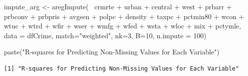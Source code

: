 \documentclass[]{article}
\newenvironment{Shaded}{}{}
\newcommand{\DataTypeTok}[1]{#1}
\newcommand{\DecValTok}[1]{#1}
\newcommand{\KeywordTok}[1]{\textcolor[rgb]{0.00,0.00,1.00}{#1}}
\newcommand{\NormalTok}[1]{#1}
\newcommand{\OperatorTok}[1]{#1}
\newcommand{\StringTok}[1]{\textcolor[rgb]{0.00,0.50,0.50}{#1}}
\begin{document}
\begin{Shaded}
\begin{Highlighting}[]
\NormalTok{impute_arg <-}\StringTok{ }\KeywordTok{aregImpute}\NormalTok{(}\OperatorTok{~}\StringTok{ }\NormalTok{crmrte }\OperatorTok{+}\StringTok{  }\NormalTok{urban }\OperatorTok{+}\StringTok{ }\NormalTok{central }\OperatorTok{+}\StringTok{ }\NormalTok{west }\OperatorTok{+}
\StringTok{                         }\NormalTok{prbarr }\OperatorTok{+}\StringTok{ }\NormalTok{prbconv }\OperatorTok{+}\StringTok{ }\NormalTok{prbpris }\OperatorTok{+}\StringTok{ }\NormalTok{avgsen }\OperatorTok{+}\StringTok{ }\NormalTok{polpc }\OperatorTok{+}\StringTok{ }
\StringTok{                         }\NormalTok{density }\OperatorTok{+}\StringTok{ }\NormalTok{taxpc }\OperatorTok{+}\StringTok{ }\NormalTok{pctmin80 }\OperatorTok{+}\StringTok{ }\NormalTok{wcon }\OperatorTok{+}\StringTok{ }\NormalTok{wtuc }\OperatorTok{+}
\StringTok{                         }\NormalTok{wtrd }\OperatorTok{+}\StringTok{ }\NormalTok{wfir }\OperatorTok{+}\StringTok{ }\NormalTok{wser }\OperatorTok{+}\StringTok{ }\NormalTok{wmfg }\OperatorTok{+}\StringTok{ }\NormalTok{wfed }\OperatorTok{+}\StringTok{ }\NormalTok{wsta }\OperatorTok{+}\StringTok{ }\NormalTok{wloc }\OperatorTok{+}
\StringTok{                         }\NormalTok{mix }\OperatorTok{+}\StringTok{ }\NormalTok{pctymle, }\DataTypeTok{data =}\NormalTok{ dfCrime, }\DataTypeTok{match=}\StringTok{"weighted"}\NormalTok{,}
                         \DataTypeTok{nk=}\DecValTok{3}\NormalTok{, }\DataTypeTok{B=}\DecValTok{10}\NormalTok{, }\DataTypeTok{n.impute =} \DecValTok{100}\NormalTok{)}
\end{Highlighting}
\end{Shaded}

\begin{Shaded}
\begin{Highlighting}[]
\KeywordTok{paste}\NormalTok{(}\StringTok{"R-squares for Predicting Non-Missing Values for Each Variable"}\NormalTok{)}
\end{Highlighting}
\end{Shaded}

\begin{verbatim}
[1] "R-squares for Predicting Non-Missing Values for Each Variable"
\end{verbatim}

\begin{Shaded}
\end{Shaded}
\end{document}
